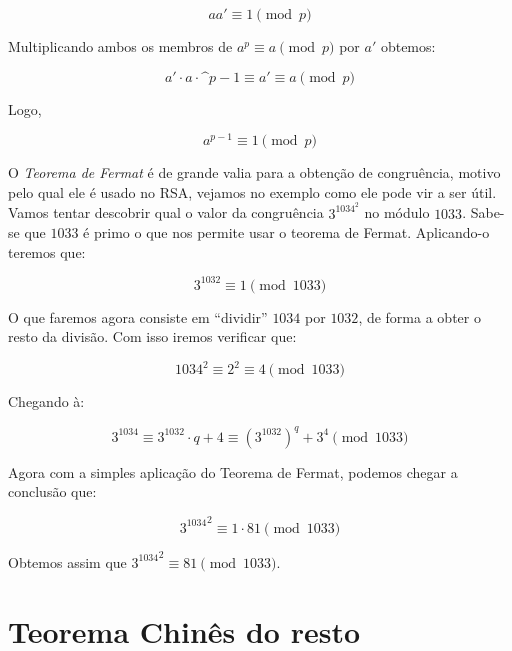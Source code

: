 $$aa' \equiv 1 \pmod{p}$$

Multiplicando ambos os membros de $a^p \equiv a \pmod{p}$ por $a'$ obtemos:

$$a'\cdot a \cdot \^{p-1} \equiv a' \equiv a \pmod{p}$$

Logo,

$$a^{p-1} \equiv 1 \pmod{p}$$
\hfill \newline

O \textit{Teorema de Fermat} \'e de grande valia para a obten\c{c}\~ao de congru\^encia, motivo pelo qual ele \'e usado no RSA, vejamos no exemplo como ele pode vir a ser \'util. Vamos tentar descobrir qual o valor da congru\^encia $3^{1034}^{2}$ no m\'odulo $1033$. Sabe-se que $1033$ \'e primo o que nos permite usar o teorema de Fermat. Aplicando-o teremos que:

$$3^{1032} \equiv 1 \pmod{1033}$$

O que faremos agora consiste em ``dividir'' $1034$ por $1032$, de forma a obter o resto da divis\~ao. Com isso iremos verificar que:

$$1034^2 \equiv 2^2 \equiv 4 \pmod{1033}$$

Chegando \`a:

$$3^{1034} \equiv 3^{1032}\cdot q + 4 \equiv (3^{1032})^{q} + 3^4 \pmod{1033}$$

Agora com a simples aplica\c{c}\~ao do Teorema de Fermat, podemos chegar a conclus\~ao que: 

$${3^{1034}}^2 \equiv 1 \cdot 81 \pmod{1033}$$

Obtemos assim que ${3^{1034}}^{2} \equiv 81 \pmod{1033}$.

\section{Teorema Chin\^es do resto}

